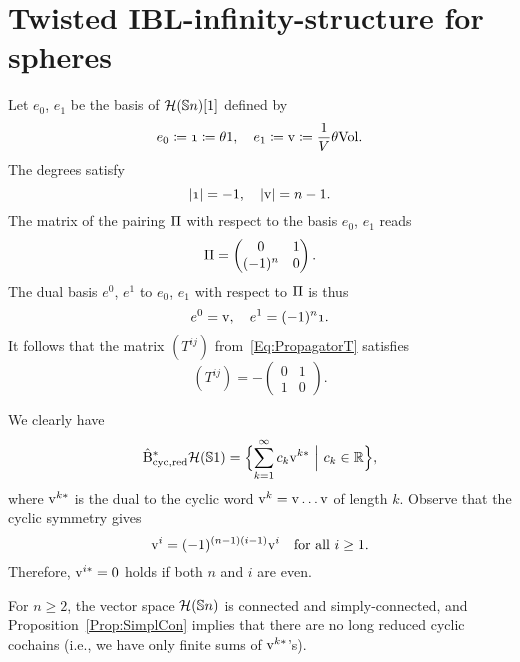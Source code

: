 \documentclass[\MainFolder/Text.tex]{subfiles}
\begin{document}
\section{Twisted IBL-infinity-structure for spheres
}
\label{Section:HomSphere}
Let $e_0$, $e_1$ be the basis of $\mathcal{H}(\mathbb{S}{n})[1]$ defined by
\begin{equation*} \label{Eq:BasisOfHarm}
 e_0 \coloneqq \NOne \coloneqq \SuspU 1, \quad e_1\coloneqq\NVol \coloneqq \frac{1}{V}\SuspU\Vol.
\end{equation*}
The degrees satisfy
$$ \Abs{\NOne} = -1, \quad \Abs{\NVol} = n-1. $$
The matrix of the pairing $\Pi$ with respect to the basis $e_0$, $e_1$ reads
$$ \Pi=\begin{pmatrix}
 0 & 1 \\
 (-1)^{n} & 0
\end{pmatrix}. $$
The dual basis $e^0$, $e^1$ to $e_0$, $e_1$ with respect to $\Pi$ is thus
$$ e^0= \NVol,\quad e^1 = (-1)^{n} \NOne. $$
It follows that the matrix $(T^{ij})$ from~\eqref{Eq:PropagatorT} satisfies
\begin{equation*} 
 (T^{ij}) = - \begin{pmatrix}
0 & 1 \\
1 & 0
\end{pmatrix}.
\end{equation*}

We clearly have
$$ \hat{\mathrm{B}}^*_{\mathrm{cyc},\mathrm{red}} \mathcal{H}(\mathbb{S}{1}) = \Bigl\{ \sum_{k=1}^\infty c_k \mathrm{v}^{k*} \ \Bigl|\  c_k \in \mathbb{R} \Bigr\}, $$
where $\mathrm{v}^{k*}$ is the dual to the cyclic word $\mathrm{v}^k = \mathrm{v} \dots \mathrm{v}$ of length $k$. Observe that the cyclic symmetry gives
\begin{equation*}
\mathrm{v}^i = (-1)^{(n-1)(i-1)} \mathrm{v}^i\quad\text{for all }i\ge 1.
\end{equation*}
Therefore, $\mathrm{v}^{i*} = 0$ holds if both $n$ and $i$ are even.

For $n\ge 2$, the vector space $\mathcal{H}(\mathbb{S}{n})$ is connected and simply-connected, and Proposition~\ref{Prop:SimplCon} implies that there are no long reduced cyclic cochains (i.e., we have only finite sums of $\mathrm{v}^{k*}$'s). 
\end{document}
